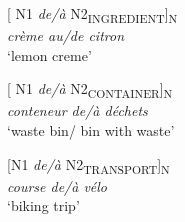 \documentclass[output=paper]{langsci/langscibook}
\begin{document}
\begin{minipage}{0.4\textwidth}
[ N1 \textit{de/à} N2\textsubscript{INGREDIENT}]\textsubscript{N}\\
\textit{crème au/de citron}\\
`lemon creme'
\end{minipage}
\hfill 
\begin{minipage}{0.4\textwidth}
[ N1 \textit{de/à} N2\textsubscript{CONTAINER}]\textsubscript{N}\\
\textit{conteneur de/à déchets }\\
`waste bin/ bin with waste'
\end{minipage}
\vspace{0.5cm}

\begin{minipage}{0.4\textwidth}
[N1 \textit{de/à} N2\textsubscript{TRANSPORT}]\textsubscript{N}\\
\textit{course de/à vélo}\\
`biking trip'\\
\end{minipage}\\
\hfill \\
\begin{minipage}{0.4\textwidth}
\end{minipage}
\end{document}
